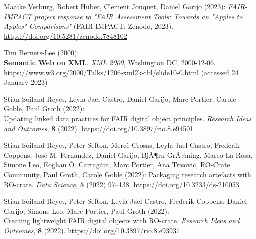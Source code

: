\begin{thebibliography}{9}
Maaike Verburg, Robert Huber, Clement Jonquet, Daniel Garijo (2023):
\emph{{FAIR-IMPACT project response to "FAIR Assessment Tools: Towards
an "Apples to Apples" Comparisons"}} ({FAIR-IMPACT}; Zenodo, 2023).
\url{https://doi.org/10.5281/zenodo.7848102}

Tim Berners-Lee (2000): \\
\textbf{Semantic Web on XML}. 
\emph{XML 2000}, Washington DC, 2000-12-06. \\
\url{https://www.w3.org/2000/Talks/1206-xml2k-tbl/slide10-0.html}
(accessed 24 January 2023)

Stian Soiland-Reyes, Leyla Jael Castro, Daniel Garijo, Marc Portier,
Carole Goble, Paul Groth (2022): \\
Updating linked data practices for
{FAIR} digital object principles. \emph{Research Ideas and Outcomes},
\textbf{8} (2022).
\url{https://doi.org/10.3897/rio.8.e94501}

Stian Soiland-Reyes, Peter Sefton, Mercè Crosas, Leyla Jael Castro,
Frederik Coppens, José M. Fernández, Daniel Garijo, BjÃ¶rn GrÃ¼ning,
Marco La Rosa, Simone Leo, Eoghan Ó. Carragáin, Marc Portier, Ana
Trisovic, RO-Crate Community, Paul Groth, Carole Goble (2022):
Packaging research artefacts with {RO}-crate. \emph{Data Science},
\textbf{5} (2022) 97--138.
\url{https://doi.org/10.3233/ds-210053}

Stian Soiland-Reyes, Peter Sefton, Leyla Jael Castro, Frederik Coppens,
Daniel Garijo, Simone Leo, Marc Portier, Paul Groth (2022): \\
Creating
lightweight {FAIR} digital objects with {RO}-crate. \emph{Research Ideas
and Outcomes}, \textbf{8} (2022).
\url{https://doi.org/10.3897/rio.8.e93937}



\end{thebibliography}

